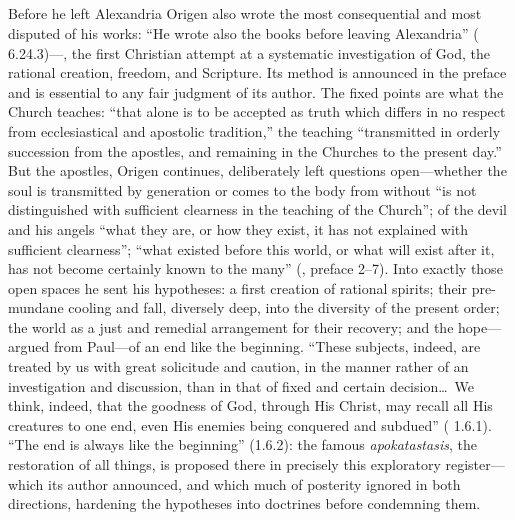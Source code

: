 \subsection{}

Before he left Alexandria Origen also wrote the most consequential and most
disputed of his works: ``He wrote also the books  before
leaving Alexandria'' ( 6.24.3)---, the first Christian attempt at a systematic investigation of
God, the rational creation, freedom, and Scripture. Its method is announced
in the preface and is essential to any fair judgment of its author. The
fixed points are what the Church teaches: ``that alone is to be accepted as
truth which differs in no respect from ecclesiastical and apostolic
tradition,'' the teaching ``transmitted in orderly succession from the
apostles, and remaining in the Churches to the present day.'' But the
apostles, Origen continues, deliberately left questions open---whether the
soul is transmitted by generation or comes to the body from without ``is not
distinguished with sufficient clearness in the teaching of the Church'';
of the devil and his angels ``what they are, or how they exist, it has not
explained with sufficient clearness''; ``what existed before this world, or
what will exist after it, has not become certainly known to the many''
(, preface 2--7). Into exactly those open spaces
he sent his hypotheses: a first creation of rational spirits; their
pre-mundane cooling and fall, diversely deep, into the diversity of the
present order; the world as a just and remedial arrangement for their
recovery; and the hope---argued from Paul---of an end like the beginning.
``These subjects, indeed, are treated by us with great solicitude and
caution, in the manner rather of an investigation and discussion, than in
that of fixed and certain decision\ldots\ We think, indeed, that the
goodness of God, through His Christ, may recall all His creatures to one
end, even His enemies being conquered and subdued'' ( 1.6.1). ``The end is always like the beginning'' (1.6.2): the
famous \textit{apokatastasis}, the restoration of all things, is proposed
there in precisely this exploratory register---which its author announced,
and which much of posterity ignored in both directions, hardening the
hypotheses into doctrines before condemning them.

